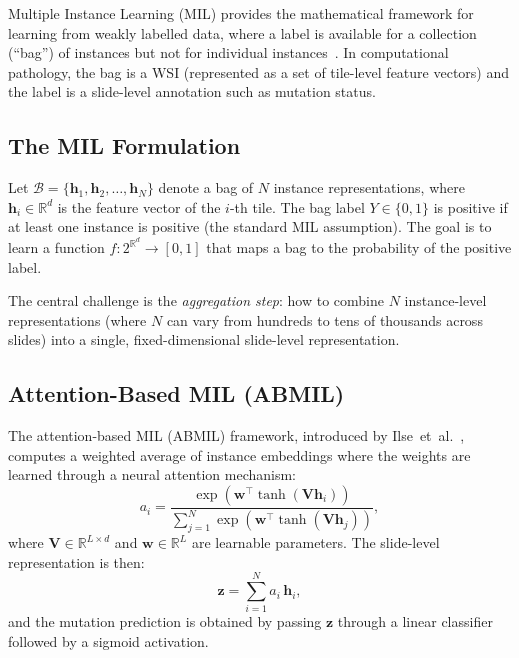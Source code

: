 Multiple Instance Learning (MIL) provides the mathematical framework for learning from weakly labelled data, where a label is available for a collection (``bag'') of instances but not for individual instances~\cite{dietterich1997mil}.
In computational pathology, the bag is a WSI (represented as a set of tile-level feature vectors) and the label is a slide-level annotation such as mutation status.

\subsection{The MIL Formulation}
\label{sec:bg:mil:formulation}

Let $\mathcal{B} = \{\mathbf{h}_1, \mathbf{h}_2, \ldots, \mathbf{h}_N\}$ denote a bag of $N$ instance representations, where $\mathbf{h}_i \in \mathbb{R}^d$ is the feature vector of the $i$-th tile.
The bag label $Y \in \{0, 1\}$ is positive if at least one instance is positive (the standard MIL assumption).
The goal is to learn a function $f: 2^{\mathbb{R}^d} \to [0,1]$ that maps a bag to the probability of the positive label.

The central challenge is the \emph{aggregation step}: how to combine $N$ instance-level representations (where $N$ can vary from hundreds to tens of thousands across slides) into a single, fixed-dimensional slide-level representation.

\subsection{Attention-Based MIL (ABMIL)}
\label{sec:bg:abmil}

The attention-based MIL (ABMIL) framework, introduced by Ilse~et~al.~\cite{ilse2018attention}, computes a weighted average of instance embeddings where the weights are learned through a neural attention mechanism:
\begin{equation}
\label{eq:abmil_attention}
a_i = \frac{\exp\left(\mathbf{w}^\top \tanh(\mathbf{V} \mathbf{h}_i)\right)}{\sum_{j=1}^{N} \exp\left(\mathbf{w}^\top \tanh(\mathbf{V} \mathbf{h}_j)\right)},
\end{equation}
where $\mathbf{V} \in \mathbb{R}^{L \times d}$ and $\mathbf{w} \in \mathbb{R}^L$ are learnable parameters.
The slide-level representation is then:
\begin{equation}
\label{eq:abmil_aggregation}
\mathbf{z} = \sum_{i=1}^{N} a_i \, \mathbf{h}_i,
\end{equation}
and the mutation prediction is obtained by passing $\mathbf{z}$ through a linear classifier followed by a sigmoid activation.


